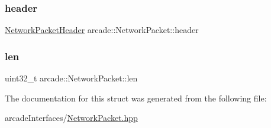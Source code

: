 \subsubsection{\texorpdfstring{header}{header}}
{\footnotesize\ttfamily \hyperlink{structarcade_1_1_network_packet_header}{Network\+Packet\+Header} arcade\+::\+Network\+Packet\+::header}

\mbox{\label{structarcade_1_1_network_packet_a1f6c07b81a4e7a276d933f326baae6fa}} 
\subsubsection{\texorpdfstring{len}{len}}
{\footnotesize\ttfamily uint32\+\_\+t arcade\+::\+Network\+Packet\+::len}



The documentation for this struct was generated from the following file\+:\begin{DoxyCompactItemize}
\item 
arcade\+Interfaces/\hyperlink{_network_packet_8hpp}{Network\+Packet.\+hpp}\end{DoxyCompactItemize}
